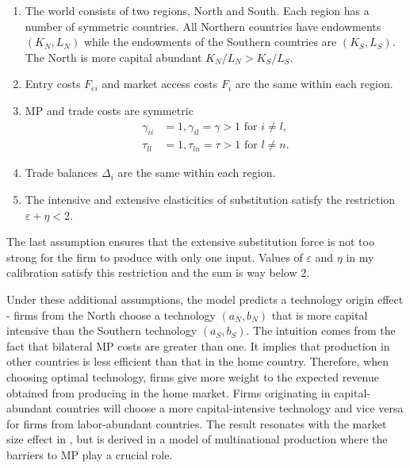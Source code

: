 \documentclass[notitlepage,11pt]{article}%
\begin{document}
\begin{enumerate}
\item The world consists of two regions, North and South. Each region has a
number of symmetric countries. All Northern countries have endowments $\left(
K_{N},L_{N}\right)  $ while the endowments of the Southern countries are
$\left(  K_{S},L_{S}\right)  $. The North is more capital abundant
$K_{N}/L_{N}>K_{S}/L_{S}.$

\item Entry costs $F_{ei}$ and market access costs $F_{i}$ are the same within
each region.

\item MP and trade costs are symmetric%
\begin{align*}
\gamma_{ii}  &  =1,\gamma_{il}=\gamma>1\text{ for }i\neq l,\\
\tau_{ll}  &  =1,\tau_{ln}=\tau>1\text{ for }l\neq n.
\end{align*}


\item Trade balances $\Delta_{i}$ are the same within each region.

\item The intensive and extensive elasticities of substitution satisfy the
restriction $\varepsilon+\eta<2$.
\end{enumerate}

The last assumption ensures that the extensive substitution force is not too
strong for the firm to produce with only one input. Values of $\varepsilon$
and $\eta$ in my calibration satisfy this restriction and the sum is way below 2.

Under these additional assumptions, the model predicts a technology origin
effect - firms from the North choose a technology $\left(  a_{N},b_{N}\right)
$ that is more capital intensive than the Southern technology $\left(
a_{S},b_{S}\right)  $. The intuition comes from the fact that bilateral MP
costs are greater than one. It implies that production in other countries is
less efficient than that in the home country. Therefore, when choosing optimal
technology, firms give more weight to the expected revenue obtained from
producing in the home market. Firms originating in capital-abundant countries
will choose a more capital-intensive technology and vice versa for firms from
labor-abundant countries. The result resonates with the market size effect in
\cite{acemoglu_patterns_2003}, but is derived in a model of multinational
production where the barriers to MP play a crucial role.
\end{document}
